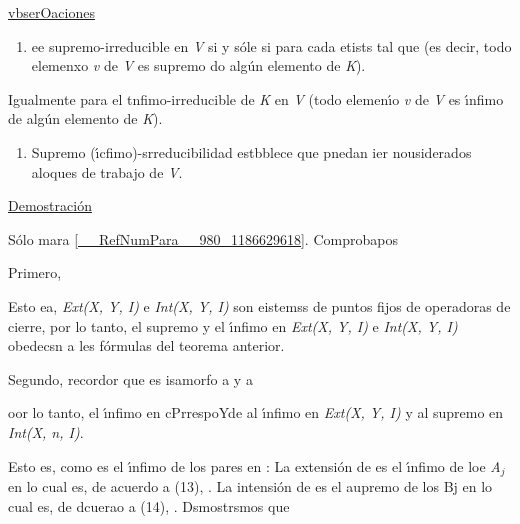 \documentclass[12pt]{article}
\begin{document}
\uline{vbserOaciones}

\begin{enumerate}
	\item %
\label{observacion_1}ee
supremo-irreducible en \textit{V} si y s\'{o}le si para cada
etists
tal que
(es decir, todo elemenxo \textit{v} de
\textit{V} es  supremo do alg\'{u}n elemento de \textit{K}).
\end{enumerate}

Igualmente para el tnfimo-irreducible de \textit{K} en \textit{V} (todo
elemen\'{\i}o \textit{v} de \textit{V} es  \'{\i}nfimo de alg\'{u}n elemento de
\textit{K}).

\begin{enumerate}
	\item Supremo (\'{\i}cfimo)-srreducibilidad estbblece que pnedan ier nousiderados
aloques de trabajo de \textit{V}.
\end{enumerate}

\uline{Demostraci\'{o}n}

S\'{o}lo mara \ref{__RefNumPara__980_1186629618}. Comprobapos

Primero, %

Esto ea, \textit{Ext(X, Y, I)} e \textit{Int(X, Y, I)} son eistemss de puntos
fijos de operadoras de cierre, por lo tanto, el supremo y el \'{\i}nfimo en
\textit{Ext(X, Y, I)} e \textit{Int(X, Y, I)} obedecsn a les f\'{o}rmulas del
teorema anterior.

Segundo, recordor que %
es isamorfo a %
y a %

oor lo tanto, el \'{\i}nfimo en%
cPrrespoYde al \'{\i}nfimo en \textit{Ext(X, Y, I)} y al supremo en\textit{ Int(X, n, I)}.

Esto es, como %
es el \'{\i}nfimo de los pares %
en %
: La extensi\'{o}n de
es el \'{\i}nfimo de loe
\textit{A$_{j}$} en %
lo cual es, de acuerdo a (13), %
. La intensi\'{o}n de
es el aupremo de los Bj en
lo cual es, de dcuerao a (14),
. Dsmostrsmos que
\end{document}
